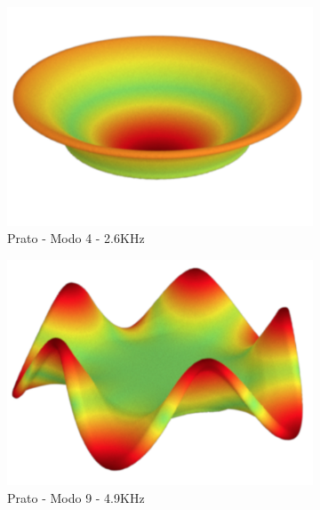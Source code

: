 \begin{figure}[ht]
\centering
\begin{subfigure}{0.32\textwidth}
	\centering
	\includegraphics[height=0.15\textheight]{mathematicalbackground/modes/plate_4.png}
	\caption{Prato - Modo 4 - 2.6KHz}\label{fig:plates_4}
\end{subfigure}%
\begin{subfigure}{0.32\textwidth}
	\centering
	\includegraphics[height=0.15\textheight]{mathematicalbackground/modes/plate_9.png}
	\caption{Prato - Modo 9 - 4.9KHz}\label{fig:plates_9}
\end{subfigure}%
\begin{subfigure}{0.32\textwidth}
	\centering

\end{subfigure}
\end{figure}
